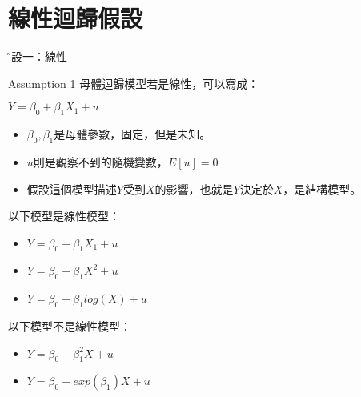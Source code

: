 \documentclass[xcolor=dvipsnames]{beamer}
\begin{document}
\section{線性迴歸假設}
\begin{frame}{\H 假設一：線性}
\begin{block}{Assumption 1}
母體迴歸模型若是線性，可以寫成：
\begin{center}
$Y=\beta_{0}+\beta_{1}X_{1}+u$
\end{center}
\end{block}
\begin{itemize}
\item $\beta_{0},\beta_{1}$是母體參數，固定，但是未知。\\
\item $u$則是觀察不到的隨機變數，$E[u]=0$\\
\item 假設這個模型描述$Y$受到$X$的影響，也就是$Y$決定於$X$，是結構模型。
\end{itemize}
以下模型是線性模型：
\begin{itemize}
\item $Y=\beta_{0}+\beta_{1}X_{1}+u$
\item $Y=\beta_{0}+\beta_{1}X^2+u$
\item $Y=\beta_{0}+\beta_{1}log(X)+u$
\end{itemize}
以下模型不是線性模型：
\begin{itemize}
\item $Y=\beta_{0}+\beta_{1}^{2}X+u$
\item $Y=\beta_{0}+exp(\beta_{1})X+u$
\end{itemize}
\end{frame}
\end{document}
